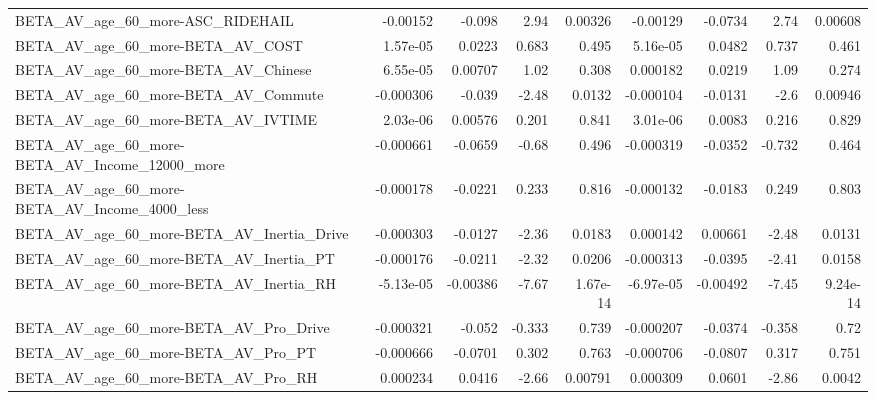 \begin{tabular}{lrrrrrrrr}
BETA\_AV\_age\_60\_more-ASC\_RIDEHAIL                   &    -0.00152 &       -0.098 &     2.94 &  0.00326 &   -0.00129 &     -0.0734 &         2.74 &       0.00608 \\
BETA\_AV\_age\_60\_more-BETA\_AV\_COST                   &    1.57e-05 &       0.0223 &    0.683 &    0.495 &   5.16e-05 &      0.0482 &        0.737 &         0.461 \\
BETA\_AV\_age\_60\_more-BETA\_AV\_Chinese                &    6.55e-05 &      0.00707 &     1.02 &    0.308 &   0.000182 &      0.0219 &         1.09 &         0.274 \\
BETA\_AV\_age\_60\_more-BETA\_AV\_Commute                &   -0.000306 &       -0.039 &    -2.48 &   0.0132 &  -0.000104 &     -0.0131 &         -2.6 &       0.00946 \\
BETA\_AV\_age\_60\_more-BETA\_AV\_IVTIME                 &    2.03e-06 &      0.00576 &    0.201 &    0.841 &   3.01e-06 &      0.0083 &        0.216 &         0.829 \\
BETA\_AV\_age\_60\_more-BETA\_AV\_Income\_12000\_more      &   -0.000661 &      -0.0659 &    -0.68 &    0.496 &  -0.000319 &     -0.0352 &       -0.732 &         0.464 \\
BETA\_AV\_age\_60\_more-BETA\_AV\_Income\_4000\_less       &   -0.000178 &      -0.0221 &    0.233 &    0.816 &  -0.000132 &     -0.0183 &        0.249 &         0.803 \\
BETA\_AV\_age\_60\_more-BETA\_AV\_Inertia\_Drive          &   -0.000303 &      -0.0127 &    -2.36 &   0.0183 &   0.000142 &     0.00661 &        -2.48 &        0.0131 \\
BETA\_AV\_age\_60\_more-BETA\_AV\_Inertia\_PT             &   -0.000176 &      -0.0211 &    -2.32 &   0.0206 &  -0.000313 &     -0.0395 &        -2.41 &        0.0158 \\
BETA\_AV\_age\_60\_more-BETA\_AV\_Inertia\_RH             &   -5.13e-05 &     -0.00386 &    -7.67 & 1.67e-14 &  -6.97e-05 &    -0.00492 &        -7.45 &      9.24e-14 \\
BETA\_AV\_age\_60\_more-BETA\_AV\_Pro\_Drive              &   -0.000321 &       -0.052 &   -0.333 &    0.739 &  -0.000207 &     -0.0374 &       -0.358 &          0.72 \\
BETA\_AV\_age\_60\_more-BETA\_AV\_Pro\_PT                 &   -0.000666 &      -0.0701 &    0.302 &    0.763 &  -0.000706 &     -0.0807 &        0.317 &         0.751 \\
BETA\_AV\_age\_60\_more-BETA\_AV\_Pro\_RH                 &    0.000234 &       0.0416 &    -2.66 &  0.00791 &   0.000309 &      0.0601 &        -2.86 &        0.0042 \\

\end{tabular}
